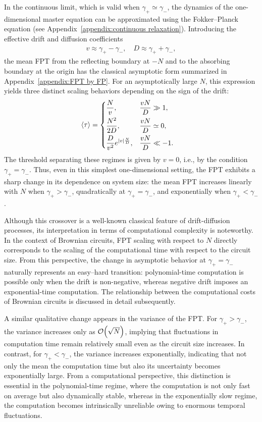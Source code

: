 \documentclass[%
 reprint,
superscriptaddress,
 amsmath,amssymb,
 aps,
 prx,
]{revtex4-2}
\begin{document}
In the continuous limit, which is valid when $\gamma_+ \simeq \gamma_-$, the dynamics of the one-dimensional master equation can be approximated using the Fokker--Planck equation (see Appendix~\ref {appendix:continuous relaxation}). 
Introducing the effective drift and diffusion coefficients  
\begin{align}
    v \approx \gamma_+ - \gamma_-, \quad D \approx \gamma_+ + \gamma_-, 
\end{align}
the mean FPT from the reflecting boundary at $-N$ and to the absorbing boundary at the origin has the classical asymptotic form summarized in Appendix~\ref{appendix:FPT by FP}. For an asymptotically large $N$, this expression yields three distinct scaling behaviors depending on the sign of the drift: 
\begin{align}
    \expval{\tau} &=
    \begin{dcases}
        \frac{N}{v}, & \frac{vN}{D}\gg 1, \\
        \frac{N^2}{2D}, & \frac{vN}{D}  \simeq  0, \\
        \frac{D}{v^2} e^{\abs{v}\frac{N}{D}}, & \frac{vN}{D} \ll -1.
    \end{dcases}\label{continuous solution}
\end{align}
The threshold separating these regimes is given by $v=0$, i.e., by the condition $\gamma_+=\gamma_-$.
Thus, even in this simplest one-dimensional setting, the FPT exhibits a sharp change in its dependence on system size: the mean FPT increases linearly with $N$ when $\gamma_+>\gamma_-$, quadratically at $\gamma_+=\gamma_-$, and exponentially when $\gamma_+<\gamma_{-}$.

Although this crossover is a well-known classical feature of drift-diffusion processes, its interpretation in terms of computational complexity is noteworthy. In the context of Brownian circuits, FPT scaling with respect to $N$ directly corresponds to the scaling of the computational time with respect to the circuit size. From this perspective, the change in asymptotic behavior at $\gamma_+=\gamma_-$ naturally represents an easy--hard transition: polynomial-time computation is possible only when the drift is non-negative, whereas negative drift imposes an exponential-time computation. The relationship between the computational costs of Brownian circuits is discussed in detail subsequently. 

A similar qualitative change appears in the variance of the FPT. For $\gamma_+>\gamma_-$, the variance increases only as $\order{\sqrt{N}}$, implying that fluctuations in computation time remain relatively small even as the circuit size increases. In contrast, for $\gamma_+<\gamma_-$, the variance increases exponentially, indicating that not only the mean the computation time but also its uncertainty becomes exponentially large. From a computational perspective,  this distinction is essential in the polynomial-time regime, where the computation is not only fast on average but also dynamically stable, whereas in the exponentially slow regime, the computation becomes intrinsically unreliable owing to enormous temporal fluctuations. 
\end{document}
